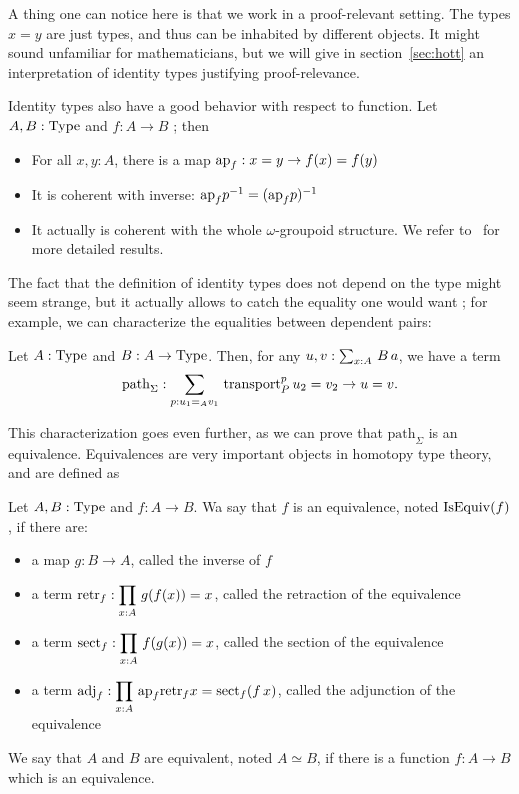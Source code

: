 A thing one can notice here is that we work in a proof-relevant
setting. The types $x=y$ are just types, and thus can be inhabited by
different objects. It might sound unfamiliar for mathematicians, but
we will give in section~\ref{sec:hott} an interpretation of identity
types justifying proof-relevance.

Identity types also have a good behavior with respect to function. Let
$A,B:\operatorname{Type}$ and $f:A \to B$ ; then
\begin{itemize}
\item For all $x,y:A$, there is a map $\mathrm{ap}_{f}: x = y \to f(x) = f(y)$
\item It is coherent with inverse: $\mathrm{ap}_{f} p^{-1} = (\mathrm{ap}_{f} p)^{-1}$
\item It actually is coherent with the whole $\omega$-groupoid
  structure. We refer to~\cite{hottbook} for more detailed results.
\end{itemize}



The fact that the 
definition of identity types does not depend on the type might seem strange, but it
actually allows to catch the equality one would want ; for example, we
can characterize the equalities between dependent pairs:

\begin{lem}
  Let $A:\operatorname{Type}$ and $B:A\to\operatorname{Type}$. Then, for any $u,v:\sum_{x:A}\, B\,
    a$, we have a term
\[ \mathrm{path}_\Sigma : \sum_{p:u_1 =_A v_1}\, \operatorname{transport}_P^p u_2 = v_2 \to u = v.\]
\end{lem}

This characterization goes even further, as we can prove that
$\mathrm{path}_\Sigma$ is an equivalence. Equivalences are very
important objects in homotopy type theory, and are defined as
\begin{defi}[Equivalence]
  Let $A,B:\operatorname{Type}$ and $f:A\to B$. Wa say that $f$ is an equivalence,
  noted $\operatorname{IsEquiv}(f)$, if there are:
  \begin{itemize}
  \item a map $g:B\to A$, called the inverse of $f$
  \item a term $\displaystyle{\mathrm{retr}_f: \prod_{x:A}\, g(f(x)) = x}$,
    called the retraction of the equivalence
  \item a term $\displaystyle{\mathrm{sect}_f: \prod_{x:A}\, f(g(x)) = x}$,
    called the section of the equivalence
  \item a term $\displaystyle{\mathrm{adj}_f: \prod_{x:A}\, \mathrm{ap}_{f} {\mathrm{retr}_f x} =
        \mathrm{sect}_f(f\, x)}$, called the adjunction of the equivalence
  \end{itemize}
  We say that $A$ and $B$ are equivalent, noted $A\simeq
  B$, if there is a
  function $f:A\to B$ which is an equivalence.
\end{defi}


